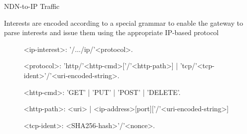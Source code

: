 \documentclass[handout]{beamer}
\begin{document}
\begin{frame}{NDN-to-IP Traffic}

Interests are encoded according to a special grammar to enable the gateway to parse interests and issue them using the appropriate IP-based protocol

\begin{figure}
\begin{mdframed}
\begingrammar
\noindent
<ip-interest>:	'/$\dots$/ip/'<protocol>.

<protocol>:	'http/'<http-cmd>[{'/'<http-path>}] | 'tcp/'<tcp-ident>'/'<uri-encoded-string>. 

<http-cmd>: 'GET' | 'PUT' | 'POST' | 'DELETE'.


<http-path>: <uri> | <ip-address>[port]['/'<uri-encoded-string>]

<tcp-ident>: <SHA256-hash>'/'<nonce>. %





		
\endgrammar
\end{mdframed}
\end{figure}

\end{frame}
\end{document}

